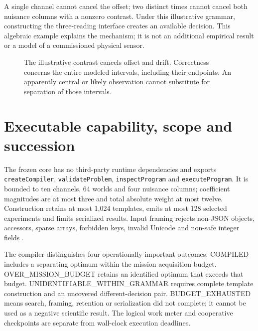 \documentclass[11pt,letterpaper]{article}
\theoremstyle{definition}\newtheorem{definition}[theorem]{Definition}
\theoremstyle{remark}\newtheorem{remark}[theorem]{Remark}
\newcommand{\status}[1]{\textsf{\small #1}}
\begin{document}
A single channel cannot cancel the offset; two distinct times cannot cancel both nuisance columns with a nonzero contrast. Under this illustrative grammar, constructing the three-reading interface creates an available decision. This algebraic example explains the mechanism; it is not an additional empirical result or a model of a commissioned physical sensor.

\begin{figure}[htbp]
\centering
{}
\caption{The illustrative contrast cancels offset and drift. Correctness concerns the entire modeled intervals, including their endpoints. An apparently central or likely observation cannot substitute for separation of those intervals.}
\label{fig:interval}
\end{figure}

\section{Executable capability, scope and succession}
\label{sec:implementation}
The frozen core has no third-party runtime dependencies and exports \texttt{createCompiler}, \texttt{validateProblem}, \texttt{inspectProgram} and \texttt{executeProgram}. It is bounded to ten channels, 64 worlds and four nuisance columns; coefficient magnitudes are at most three and total absolute weight at most twelve. Construction retains at most 1,024 templates, emits at most 128 selected experiments and limits serialized results. Input framing rejects non-JSON objects, accessors, sparse arrays, forbidden keys, invalid Unicode and non-safe integer fields \citep{compiler}.

The compiler distinguishes four operationally important outcomes. \status{COMPILED} includes a separating optimum within the mission acquisition budget. \status{OVER\_MISSION\_BUDGET} retains an identified optimum that exceeds that budget. \status{UNIDENTIFIABLE\_WITHIN\_GRAMMAR} requires complete template construction and an uncovered different-decision pair. \status{BUDGET\_EXHAUSTED} means search, framing, retention or serialization did not complete; it cannot be used as a negative scientific result. The logical work meter and cooperative checkpoints are separate from wall-clock execution deadlines.
\end{document}
